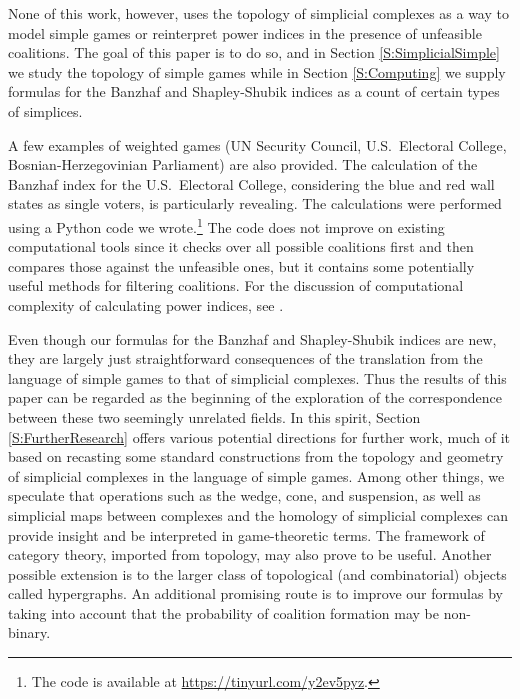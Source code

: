 \documentclass[11pt]{amsart}
\theoremstyle{plain}
\theoremstyle{definition}
\theoremstyle{remark}
\begin{document}
None of this work, however, uses the topology of simplicial complexes as a way to model simple games or reinterpret power indices in the presence of unfeasible coalitions. The goal of this paper is to do so, and in Section \ref{S:SimplicialSimple} we study the topology of simple games while in Section \ref{S:Computing} we supply formulas for the Banzhaf and Shapley-Shubik indices as a count of certain types of simplices. 

A few examples of weighted games (UN Security Council, U.S.~Electoral College, Bosnian-Herzegovinian Parliament) are also provided. The calculation of the Banzhaf index for the U.S.~Electoral College, considering the blue and red wall states as single voters, is particularly revealing. The calculations were performed using a Python code we wrote.\footnote{The code is available at \url{https://tinyurl.com/y2ev5pyz}.} The code does not improve on existing computational tools since it checks over all possible coalitions first and then compares those against the unfeasible ones, but it contains some potentially useful methods for filtering coalitions. For the discussion of computational complexity of calculating power indices, see \cite{MM:AlgorithmsIndices}.

Even though our formulas for the Banzhaf and Shapley-Shubik indices are new, they are largely just straightforward consequences of the translation from the language of simple games to that of simplicial complexes. Thus the results of this paper can be regarded as the beginning of the exploration of the correspondence between these two seemingly unrelated fields. In this spirit, Section \ref{S:FurtherResearch} offers various potential directions for further work, much of it based on recasting some standard constructions from the topology and geometry of simplicial complexes in the language of simple games. Among other things, we speculate that operations such as the wedge, cone, and suspension, as well as simplicial maps between complexes and the homology of simplicial complexes can provide insight and be interpreted in game-theoretic terms.  The framework of category theory, imported from topology, may also prove to be useful. Another possible extension is to the larger class of topological (and combinatorial) objects called hypergraphs. An additional promising route is to improve our formulas by taking into account that the probability of coalition formation may be non-binary.




\end{document}
